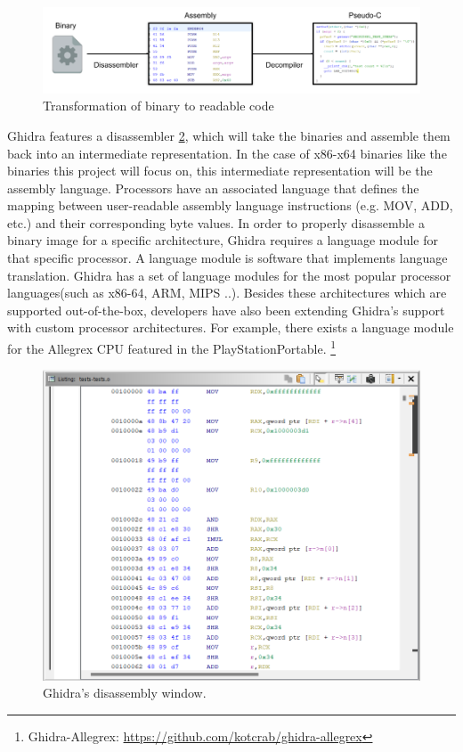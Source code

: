 \begin{figure}[!h]
  \centering
  \includegraphics[width=\linewidth]{img/ghidra.png}
  \caption{Transformation of binary to readable code}
  \label{fig:ghidra}
\end{figure}

Ghidra features a disassembler \ref{fig:disassembler}, which will take the binaries and assemble them back into an intermediate representation. In the case of x86-x64 binaries like the binaries this project will focus on, this intermediate representation will be the assembly language. Processors have an associated language that defines the mapping
between user-readable assembly language instructions (e.g. MOV, ADD, etc.) and their corresponding byte values. In order to properly disassemble a binary image for a specific architecture, Ghidra requires a language module for that specific processor. A language module is software that implements language translation. Ghidra has a set of language modules for the most popular processor languages(such as x86-64, ARM, MIPS ..). Besides these architectures which are supported out-of-the-box, developers have also been extending Ghidra's support with custom processor architectures. For example, there exists a language module for the Allegrex CPU featured in the PlayStationPortable.  \footnote{Ghidra-Allegrex: \url{https://github.com/kotcrab/ghidra-allegrex}}
\begin{figure}[H]
  \centering
  \includegraphics[width=\linewidth]{img/disassembler.png}
  \caption{Ghidra's disassembly window.}
  \label{fig:disassembler}
\end{figure}

